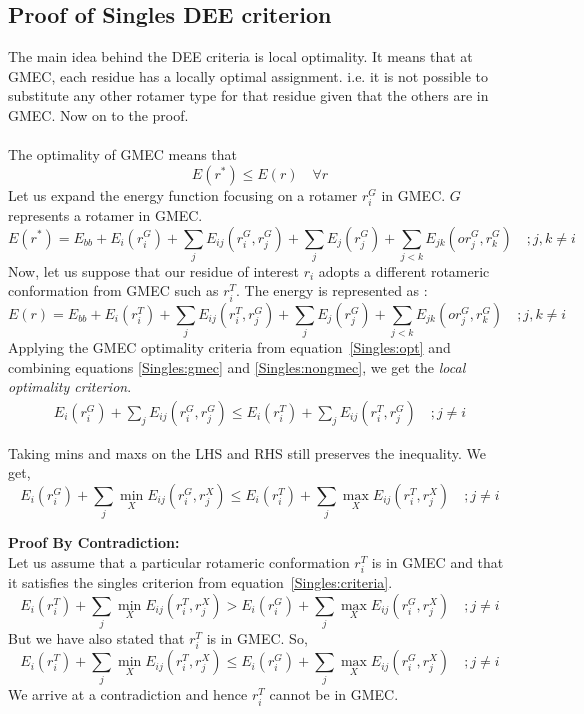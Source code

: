 \documentclass[a4]{article}
\begin{document}
\subsection{Proof of Singles DEE criterion}
The main idea behind the DEE criteria is local optimality. It means that at GMEC, each residue has a locally optimal assignment. i.e. it is not possible to substitute any other rotamer type for that residue given that the others are in GMEC. Now on to the proof.
\\
\\
The optimality of GMEC means that 
\begin{equation}
\label{Singles:opt}
E(r^*) \leq E(r) \quad \forall r
\end{equation}
Let us expand the energy function focusing on a rotamer $r_i^G$ in GMEC. $G$ represents a rotamer in GMEC.
\begin{equation}
\label{Singles:gmec}
E(r^*) = E_{bb} + E_i(r_i^G) + \sum_j E_{ij}(r_i^G,r_j^G) + \sum_j E_j(r_j^G) + \sum_{j<k} E_{jk}(or_j^G,r_k^G) \quad ; j,k\neq i
\end{equation}
Now, let us suppose that our residue of interest $r_i$ adopts a different rotameric conformation from  GMEC such as $r_i^T$. The energy is represented as :
\begin{equation}
\label{Singles:nongmec}
E(r) = E_{bb} + E_i(r_i^T) + \sum_j E_{ij}(r_i^T,r_j^G) + \sum_j E_j(r_j^G) + \sum_{j<k} E_{jk}(or_j^G,r_k^G) \quad ; j,k\neq i
\end{equation}
Applying the GMEC optimality criteria from equation~\ref{Singles:opt} and combining equations \ref{Singles:gmec} and \ref{Singles:nongmec}, we get the \emph{local optimality criterion}. 
\begin{align*}
E_i(r_i^G) + \sum_j E_{ij}(r_i^G,r_j^G) \leq E_i(r_i^T) + \sum_j E_{ij}(r_i^T,r_j^G)  \quad   
; j\neq i 
\end{align*}



Taking mins and maxs on the LHS and RHS still preserves the inequality. We get, 
\begin{equation}
E_i(r_i^G) + \sum_j \min_X E_{ij}(r_i^G,r_j^X) \leq E_i(r_i^T) + \sum_j \max_X E_{ij}(r_i^T,r_j^X)  \quad   
; j\neq i 
\end{equation}


\textbf{Proof By Contradiction:}
\\
Let us assume that a particular rotameric conformation $r_i^T$ is in GMEC and that it satisfies the singles criterion from equation~\ref{Singles:criteria}. 
\[
E_i(r_i^T) + \sum_j \min_X E_{ij}(r_i^T,r_j^X) > E_i(r_i^G) + \sum_j \max_X E_{ij}(r_i^G,r_j^X) \quad   
; j\neq i
\]
But we have also stated that $r_i^T$ is in GMEC. So,
\[
E_i(r_i^T) + \sum_j \min_X E_{ij}(r_i^T,r_j^X) \leq E_i(r_i^G) + \sum_j \max_X E_{ij}(r_i^G,r_j^X) \quad   
; j\neq i
\]
We arrive at a contradiction and hence  $r_i^T$ cannot be in GMEC. 
\end{document}
